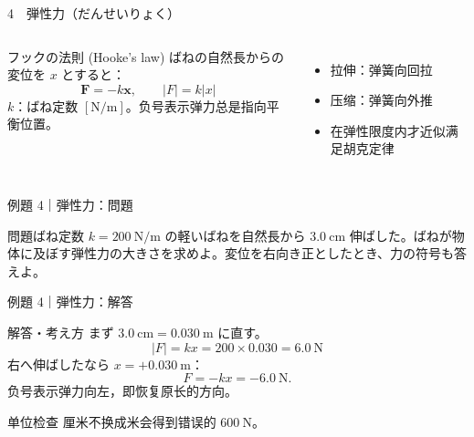 \documentclass[notheorems,aspectratio=169]{beamer}
\newcommand{\en}[1]{\textcolor{GraphGray}{\scriptsize(#1)}}
\newcommand{\qcard}[1]{%
  \begin{block}{問題}\centering\large #1\end{block}}
\newcommand{\acard}[1]{%
  \begin{exampleblock}{解答・考え方}#1\end{exampleblock}}
\newcommand{\forcearrow}[5]{%
  \draw[-{Latex[length=3mm]},very thick,#5] (#1,#2)--++(#3,#4);}
\begin{document}
\begin{frame}{4　弾性力（だんせいりょく）}
\begin{columns}[c]
\begin{block}{フックの法則 \en{Hooke's law}}
ばねの自然長からの変位を $x$ とすると：
\[
\bm F=-k\bm x,\qquad |F|=k|x|
\]
$k$：ばね定数 $[\mathrm{N/m}]$。负号表示弹力总是指向平衡位置。
\end{block}
\begin{itemize}
  \item 拉伸：弹簧向回拉
  \item 压缩：弹簧向外推
  \item 在弹性限度内才近似满足胡克定律
\end{itemize}
\centering
{}
\end{columns}
\end{frame}

\begin{frame}{例題 4｜弾性力：問題}
\vfill
\qcard{ばね定数 $k=200\ \mathrm{N/m}$ の軽いばねを自然長から $3.0\ \mathrm{cm}$ 伸ばした。ばねが物体に及ぼす弾性力の大きさを求めよ。変位を右向き正としたとき、力の符号も答えよ。}
\vfill
\end{frame}

\begin{frame}{例題 4｜弾性力：解答}
\acard{
まず $3.0\ \mathrm{cm}=0.030\ \mathrm m$ に直す。
\[
|F|=kx=200\times0.030=\boxed{6.0\ \mathrm N}
\]
右へ伸ばしたなら $x=+0.030\ \mathrm m$：
\[
F=-kx=\boxed{-6.0\ \mathrm N}.
\]
负号表示弹力向左，即恢复原长的方向。}
\begin{alertblock}{单位检查}
厘米不换成米会得到错误的 $600\ \mathrm N$。
\end{alertblock}
\end{frame}
\end{document}
